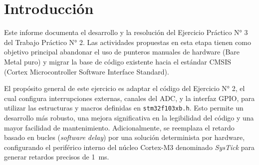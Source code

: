 \chapter{Introducción}
\label{ch:introduccion}

Este informe documenta el desarrollo y la resolución del Ejercicio Práctico N° 3 del Trabajo Práctico N° 2.
Las actividades propuestas en esta etapa tienen como objetivo principal abandonar el uso de punteros
manuales de hardware (Bare Metal puro) y migrar la base de código existente hacia el estándar CMSIS
(Cortex Microcontroller Software Interface Standard).

El propósito general de este ejercicio es adaptar el código del Ejercicio N° 2, el cual configura
interrupciones externas, canales del ADC, y la interfaz GPIO, para utilizar las estructuras y macros
definidas en \lstinline{stm32f103xb.h}. Esto permite un desarrollo más robusto, una mejora significativa en la
legibilidad del código y una mayor facilidad de mantenimiento. Adicionalmente, se reemplaza el retardo
basado en bucles (\textit{software delay}) por una solución determinista por hardware, configurando el periférico
interno del núcleo Cortex-M3 denominado \textit{SysTick} para generar retardos precisos de \qty{1}{\ms}.
